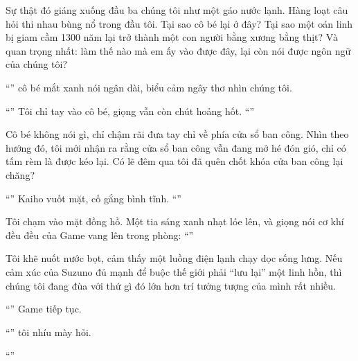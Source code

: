 \documentclass[../main.tex]{subfiles}
\begin{document}
Sự thật đó giáng xuống đầu ba chúng tôi như một gáo nước lạnh. Hàng loạt câu hỏi thi nhau bùng nổ trong đầu tôi. Tại sao cô bé lại ở đây? Tại sao một oán linh bị giam cầm 1300 năm lại trở thành một con người bằng xương bằng thịt? Và quan trọng nhất: làm thế nào mà em ấy vào được đây, lại còn nói được ngôn ngữ của chúng tôi?

``'' cô bé mắt xanh nói ngân dài, biểu cảm ngây thơ nhìn chúng tôi.

``'' Tôi chỉ tay vào cô bé, giọng vẫn còn chút hoảng hốt. ``''

Cô bé không nói gì, chỉ chậm rãi đưa tay chỉ về phía cửa sổ ban công. Nhìn theo hướng đó, tôi mới nhận ra rằng cửa sổ ban công vẫn đang mở hé đón gió, chỉ có tấm rèm là được kéo lại. Có lẽ đêm qua tôi đã quên chốt khóa cửa ban công lại chăng?

``'' Kaiho vuốt mặt, cố gắng bình tĩnh. ``''

Tôi chạm vào mặt đồng hồ. Một tia sáng xanh nhạt lóe lên, và giọng nói cơ khí đều đều của Game vang lên trong phòng: ``''

Tôi khẽ nuốt nước bọt, cảm thấy một luồng điện lạnh chạy dọc sống lưng. Nếu cảm xúc của Suzuno đủ mạnh để buộc thế giới phải ``lưu lại'' một linh hồn, thì chúng tôi đang đùa với thứ gì đó lớn hơn trí tưởng tượng của mình rất nhiều.

``'' Game tiếp tục.

``'' tôi nhíu mày hỏi.

``''
\end{document}
